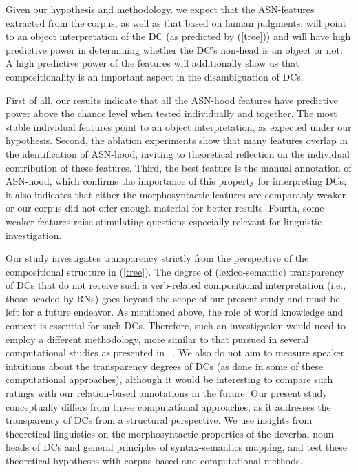 \documentclass[output=paper]{langsci/langscibook}
\begin{document}
Given our hypothesis and methodology, we expect that the ASN-features extracted from the corpus, as well as that based on human judgments, will point to an object interpretation of the DC (as predicted by  (\ref{tree})) and will have high predictive power in determining whether the DC's non-head is an object or not. A high predictive power of the features will additionally show us that compositionality is an important aspect in the disambiguation of DCs.

First of all, our results indicate that all the ASN-hood features have predictive power above the chance level when tested individually and  together. The most stable individual features point to an object interpretation, as expected under our hypothesis. Second, the ablation experiments  show that many features overlap in the identification of ASN-hood, inviting to theoretical reflection on  the individual contribution of these features. Third, the best feature is the manual annotation of ASN-hood,  which confirms the importance of this property for interpreting DCs;  it also indicates that either the morphosyntactic features are comparably weaker or our corpus did not offer enough material for better results. Fourth, some weaker features raise stimulating questions especially relevant for linguistic investigation.

 Our study investigates transparency strictly from the perspective of the compositional structure in  (\ref{tree}). The degree of (lexico-semantic) transparency of DCs that do not receive such a verb-related compositional interpretation (i.e., those headed by RNs) goes beyond the scope of our present study and must be left for a future endeavor. As mentioned above, the role of world knowledge and context is essential for such DCs. Therefore, such an investigation would need to employ a different methodology, more similar to that pursued in several computational studies as presented in  ~. We also do not aim to measure speaker intuitions about the transparency degrees of DCs (as done in some of these computational approaches), although it would be interesting to compare such ratings with our relation-based annotations  in the future. Our present study conceptually differs from these computational approaches, as it addresses the transparency of DCs from a structural perspective. We use insights from theoretical linguistics on the morphosyntactic properties of the deverbal noun heads of DCs and general principles of syntax-semantics mapping, and test these theoretical hypotheses  with corpus-based and computational methods.
\end{document}
